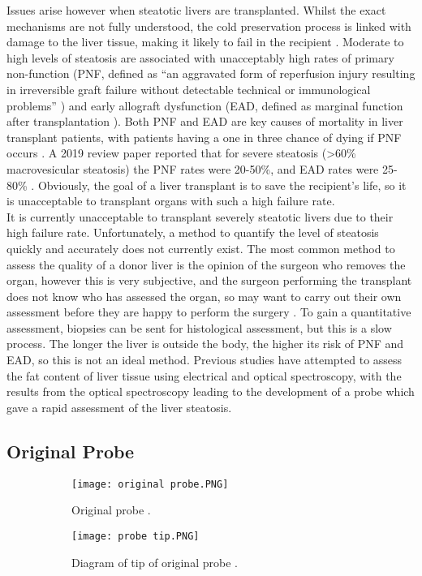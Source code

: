 Issues arise however when steatotic livers are transplanted. Whilst the exact mechanisms are not fully understood, the cold preservation process is linked with damage to the liver tissue, making it likely to fail in the recipient \cite{Imber2002}. Moderate to high levels of steatosis are associated with unacceptably high rates of primary non-function (PNF, defined as “an aggravated form of reperfusion injury resulting in irreversible graft failure without detectable technical or immunological problems” \cite{Lock2010}) and early allograft dysfunction (EAD, defined as marginal function after transplantation \cite{Deschenes2013}). Both PNF and EAD are key causes of mortality in liver transplant patients, with patients having a one in three chance of dying if PNF occurs \cite{Robertson}. A 2019 review paper reported that for severe steatosis (\textgreater60\% macrovesicular steatosis) the PNF rates were 20-50\%, and EAD rates were 25-80\% \cite{Linares2019}. Obviously, the goal of a liver transplant is to save the recipient’s life, so it is unacceptable to transplant organs with such a high failure rate.\\

It is currently unacceptable to transplant severely steatotic livers due to their high failure rate. Unfortunately, a method to quantify the level of steatosis quickly and accurately does not currently exist. The most common method to assess the quality of a donor liver is the opinion of the surgeon who removes the organ, however this is very subjective, and the surgeon performing the transplant does not know who has assessed the organ, so may want to carry out their own assessment before they are happy to perform the surgery \cite{Robertson}. To gain a quantitative assessment, biopsies can be sent for histological assessment, but this is a slow process. The longer the liver is outside the body, the higher its risk of PNF and EAD, so this is not an ideal method. Previous studies \cite{McLaughlin2010} have attempted to assess the fat content of liver tissue using electrical and optical spectroscopy, with the results from the optical spectroscopy leading to the development of a probe \cite{Robertson} which gave a rapid assessment of the liver steatosis. \\


\subsection{Original Probe}

\begin{figure}[htbp]
	\centering
	\begin{subfigure}[b]{0.4\linewidth}
		\texttt{[image: original probe.PNG]}
		\caption{Original probe \cite{Robertson}.}
		\label{fig: original probe}
	\end{subfigure}
	\begin{subfigure}[b]{0.4\linewidth}
		\texttt{[image: probe tip.PNG]}
		\caption{Diagram of tip of original probe \cite{Robertson}.}
		\label{fig: probe tip}
	\end{subfigure}
	\caption{}
\end{figure}


